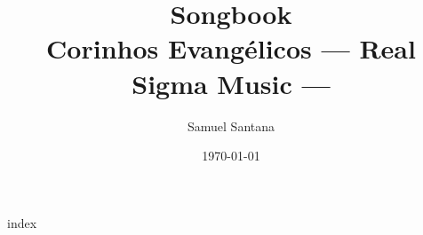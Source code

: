 



\title{\rmfamily\bfseries\Huge Songbook \\ Corinhos Evangélicos 
    \vfill
    \sffamily\small --- Real Sigma Music ---}
\author{\sffamily\small Samuel Santana}
\date{\sffamily\small\today}

\maketitle

\thispagestyle{empty}
\cleardoublepage


\begin{songs}{index}

 \brk
 \brk
 \brk
 \brk

\end{songs}

\newpage
\thispagestyle{empty}
\null
\newpage


